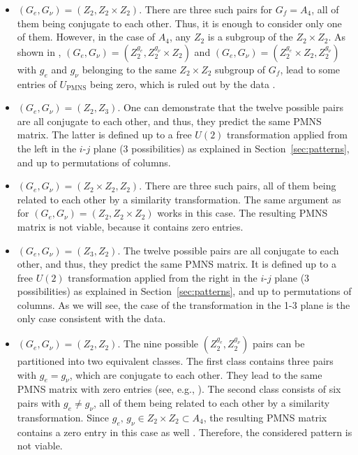 \documentclass[11pt,a4paper]{article}
\numberwithin{equation}{section}
\begin{document}
\begin{itemize}
\item $(G_e,G_\nu) = (Z_2,Z_2\times Z_2)$. 
There are three such pairs for $G_f = A_4$, 
all of them being conjugate to each other. 
Thus, it is enough to consider only one of them. 
However, in the case of $A_4$, any $Z_2$ is a subgroup of the $Z_2\times Z_2$. 
As shown in \cite{Girardi:2015rwa}, 
$(G_e,G_\nu) = (Z_2^{g_e},Z_2^{g_\nu}\times Z_2)$ and 
$(G_e,G_\nu) = (Z_2^{g_e}\times Z_2,Z_2^{g_\nu})$ with 
$g_e$ and $g_\nu$ belonging to the same 
$Z_2\times Z_2$ subgroup of $G_f$, lead to some entries 
of $U_\mathrm{PMNS}$ being zero, which is ruled out
by the data \cite{NuFITv32Jan2018}.
%
\item $(G_e,G_\nu) = (Z_2,Z_3)$. 
One can demonstrate that the twelve possible pairs are all conjugate to each other, 
and thus, they predict the same PMNS matrix.
The latter is defined up to a free $U(2)$ transformation  
applied from the left in the $i$-$j$ plane (3 possibilities)  
as explained in Section~\ref{sec:patterns}, and up to permutations of columns.
%
\item $(G_e,G_\nu) = (Z_2\times Z_2,Z_2)$. 
There are three  such pairs, 
all of them being related to each other by a similarity transformation. 
The same argument as for $(G_e,G_\nu) = (Z_2,Z_2\times Z_2)$ works in this case. 
The resulting PMNS matrix is not viable, because it contains zero entries.
%
\item $(G_e,G_\nu) = (Z_3,Z_2)$. 
The twelve possible pairs are all conjugate to each other, 
and thus, they predict the same PMNS matrix.
It is defined up to a free $U(2)$ transformation 
applied from the right in the $i$-$j$ plane (3 possibilities)  
as explained in Section~\ref{sec:patterns}, and up to permutations of columns. 
As we will see, the case of the transformation in the 1-3 plane is the only case 
consistent with the data.
%
\item $(G_e,G_\nu) = (Z_2,Z_2)$. 
The nine possible $(Z_2^{g_e},Z_2^{g_\nu})$ pairs can be partitioned 
into two equivalent classes. 
The first class contains three pairs with $g_e = g_\nu$, which are conjugate to each other. 
They lead to the same PMNS matrix with zero entries 
(see, e.g., \cite{Girardi:2015rwa,Penedo:2017vtf}). 
The second class consists of six pairs with $g_e \neq g_\nu$, all of them being related to
each other by a similarity transformation. 
Since $g_e,\,g_\nu \in Z_2\times Z_2 \subset A_4$, 
the resulting PMNS matrix contains a zero entry in this case as well  \cite{Girardi:2015rwa,Penedo:2017vtf}. 
Therefore, the considered pattern is not viable.
\end{itemize}
\end{document}
